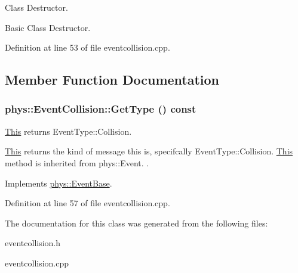 Class Destructor. 

Basic Class Destructor. 

Definition at line 53 of file eventcollision.cpp.



\subsection{Member Function Documentation}
\hypertarget{classphys_1_1EventCollision_a96c2809f1bbab78b9f2758cea15a9a36}{
\subsubsection[{GetType}]{ phys::EventCollision::GetType () const}}
\label{dd/de9/classphys_1_1EventCollision_a96c2809f1bbab78b9f2758cea15a9a36}


\hyperlink{structThis}{This} returns EventType::Collision. 

\hyperlink{structThis}{This} returns the kind of message this is, specifcally EventType::Collision. \hyperlink{structThis}{This} method is inherited from phys::Event. . 

Implements \hyperlink{classphys_1_1EventBase_a1b3d29b6ecf30f18cc3e1825a515c508}{phys::EventBase}.



Definition at line 57 of file eventcollision.cpp.



The documentation for this class was generated from the following files:\begin{DoxyCompactItemize}
\item 
eventcollision.h\item 
eventcollision.cpp\end{DoxyCompactItemize}
